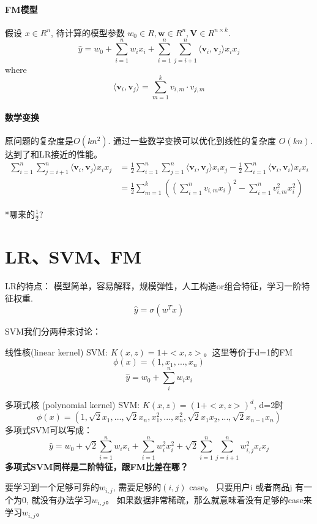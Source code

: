 \documentclass{article}
\begin{document}
\begin{CJK*}{UTF8}{gbsn}
\paragraph{FM模型} 假设 $x \in R^{n}$, 待计算的模型参数 $ w_{0} \in R, \textbf{w} \in R^{n}, \textbf{V} \in R^{n \times k}$.
$$\widehat{y}= w_{0}+\sum_{i=1}^{n}w_{i}x_{i}+\sum_{i=1}^{n}\sum_{j=i+1}^{n}\langle \textbf{v}_{i} ,\textbf{v}_{j} \rangle x_{i}x_{j}$$
where 
$$\langle \textbf{v}_{i} ,\textbf{v}_{j} \rangle =\sum_{m=1}^{k}v_{i,m} \cdot v_{j,m}$$

\paragraph{数学变换} 原问题的复杂度是$O(kn^{2})$. 通过一些数学变换可以优化到线性的复杂度 $O(kn)$. 达到了和LR接近的性能。
\begin{align*}
\sum_{i=1}^{n}\sum_{j=i+1}^{n}\langle \textbf{v}_{i} ,\textbf{v}_{j} \rangle x_{i}x_{j}
&= \frac{1}{2} \sum_{i=1}^{n}\sum_{j=1}^{n}\langle \textbf{v}_{i} ,\textbf{v}_{j} \rangle x_{i}x_{j} -\frac{1}{2}\sum_{i=1}^{n}\langle \textbf{v}_{i} ,\textbf{v}_{i} \rangle x_{i}x_{i} \\
&= \frac{1}{2}\sum_{m=1}^{k}\left( \left(\sum_{i=1}^{n}v_{i,m}x_{i}\right)^{2} -\sum_{i=1}^{n}v_{i,m}^{2}x_{i}^{2} \right)
\end{align*}

*哪来的$\frac{1}{2}$?

\section{LR、SVM、FM}
LR的特点： 模型简单，容易解释，规模弹性，人工构造or组合特征，学习一阶特征权重.
$$\widehat{y}=\sigma(w^{T}x)$$

SVM我们分两种来讨论：

线性核(linear kernel) SVM: $K(x,z)=1+<x,z>$。这里等价于d=1的FM
$$\phi(x)=(1,x_{1},...,x_{n})$$
$$\widehat{y}=w_{0}+\sum_{i}^{n}w_{i}x_{i}$$

多项式核 (polynomial kernel) SVM: $K(x,z)=(1+<x,z>)^{d}$, d=2时
$$\phi(x)=(1,\sqrt{2}x_{1},...,\sqrt{2}x_{n},x_{1}^2,...,x_{n}^2,\sqrt{2}x_{1}x_{2},...,\sqrt{2}x_{n-1}x_{n})$$
多项式SVM可以写成：
$$\widehat{y}= w_{0}+\sqrt{2}\sum_{i=1}^{n}w_{i}x_{i}+\sum_{i=1}^{n}w_{i}^{2}x_{i}^{2}+\sqrt{2} \sum_{i=1}^{n}\sum_{j=i+1}^{n} w_{i,j}^{2} x_{i}x_{j}$$
\noindent
\textbf{多项式SVM同样是二阶特征，跟FM比差在哪？}

要学习到一个足够可靠的$w_{i,j}$, 需要足够的$(i,j)$ case。 只要用户i 或者商品j 有一个为0, 就没有办法学习$w_{i,j}$。 如果数据非常稀疏，那么就意味着没有足够的case来学习$w_{i,j}$。


\end{CJK*}
\end{document}

